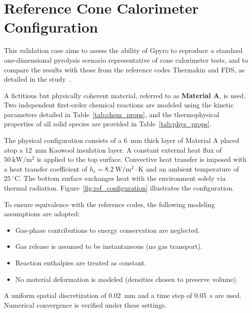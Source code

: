 \documentclass[12pt]{article}
\begin{document}
\fi

\section{Reference Cone Calorimeter Configuration}

This validation case aims to assess the ability of Gpyro to reproduce a standard one-dimensional pyrolysis scenario representative of cone calorimeter tests, and to compare the results with those from the reference codes Thermakin and FDS, as detailed in the study~\cite{abdelhafiz2025}.

A fictitious but physically coherent material, referred to as \textbf{Material A}, is used. Two independent first-order chemical reactions are modeled using the kinetic parameters detailed in Table~\ref{tab:chem_props}, and the thermophysical properties of all solid species are provided in Table~\ref{tab:phys_props}.

The physical configuration consists of a 6~mm thick layer of Material A placed atop a 12~mm Kaowool insulation layer. A constant external heat flux of $50~\mathrm{kW/m^2}$ is applied to the top surface. Convective heat transfer is imposed with a heat transfer coefficient of $h_c = 8.2~\mathrm{W/m^2{\cdot}K}$ and an ambient temperature of $25~^\circ\mathrm{C}$. The bottom surface exchanges heat with the environment solely via thermal radiation. Figure~\ref{fig:ref_configuration} illustrates the configuration.

To ensure equivalence with the reference codes, the following modeling assumptions are adopted:

\begin{itemize}[noitemsep, topsep=0pt]
\item Gas-phase contributions to energy conservation are neglected.
\item Gas release is assumed to be instantaneous (no gas transport).
\item Reaction enthalpies are treated as constant.
\item No material deformation is modeled (densities chosen to preserve volume).
\end{itemize}

\vspace{1em} 

A uniform spatial discretization of 0.02~mm and a time step of 0.05~s are used. Numerical convergence is verified under these settings.
\end{document}
